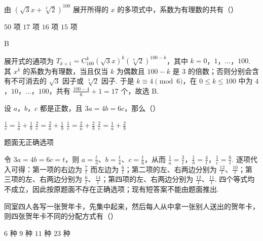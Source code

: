 \begin{problem}
由 \((\sqrt{3} x + \sqrt[3]{2})^{100}\) 展开所得的 \(x\) 的多项式中，系数为有理数的共有（\quad）

\choices
    {\(50\) 项}
    {\(17\) 项}
    {\(16\) 项}
    {\(15\) 项}
\end{problem}

\begin{answer}
B
\end{answer}

\begin{solution}
展开式的通项为 \(T_{k+1}=\mathrm C_{100}^{k}(\sqrt{3}x)^k(\sqrt[3]{2})^{100-k}\)，其中 \(k=0\)，\(1\)，\(\ldots\)，\(100\). 其 \(x^k\) 的系数为有理数，当且仅当 \(k\) 为偶数且 \(100-k\) 是 \(3\) 的倍数；否则分别会含有不可消去的 \(\sqrt{3}\) 因子或 \(\sqrt[3]{2}\) 因子. 于是 \(k\equiv4\pmod{6}\)，在 \(0\leqslant k\leqslant100\) 中为 \(4\)，\(10\)，\(\ldots\)，\(100\)，共有 \(\frac{100-4}{6}+1=17\) 个，故选 B.
\end{solution}

\begin{problem}
设 \(a\)，\(b\)，\(c\) 都是正数，且 \(3a = 4b = 6c\)，那么（\quad）

\choices
    {\(\frac{1}{c} = \frac{1}{a} + \frac{1}{b}\)}
    {\(\frac{2}{c} = \frac{2}{a} + \frac{1}{b}\)}
    {\(\frac{1}{c} = \frac{2}{a} + \frac{2}{b}\)}
    {\(\frac{2}{c} = \frac{1}{a} + \frac{2}{b}\)}
\end{problem}

\begin{answer}
题面无正确选项
\end{answer}

\begin{solution}
令 \(3a=4b=6c=t\)，则 \(a=\frac{t}{3}\)、\(b=\frac{t}{4}\)、\(c=\frac{t}{6}\)，从而
\(\displaystyle \frac{1}{a}=\frac{3}{t}\)，\(\displaystyle \frac{1}{b}=\frac{4}{t}\)，\(\displaystyle \frac{1}{c}=\frac{6}{t}\). 逐项代入可得：第一项的右边为 \(\frac{7}{t}\) 而左边为 \(\frac{6}{t}\)；第二项的左、右两边分别为 \(\frac{12}{t}\)、\(\frac{10}{t}\)；第三项的左、右两边分别为 \(\frac{6}{t}\)、\(\frac{14}{t}\)；第四项的左、右两边分别为 \(\frac{12}{t}\)、\(\frac{11}{t}\). 四个等式均不成立，因此按原题面不存在正确选项；现有短答案不能由题面推出.
\end{solution}

\begin{problem}
同室四人各写一张贺年卡，先集中起来，然后每人从中拿一张别人送出的贺年卡，则四张贺年卡不同的分配方式有（\quad）

\choices
    {\(6\) 种}
    {\(9\) 种}
    {\(11\) 种}
    {\(23\) 种}
\end{problem}

